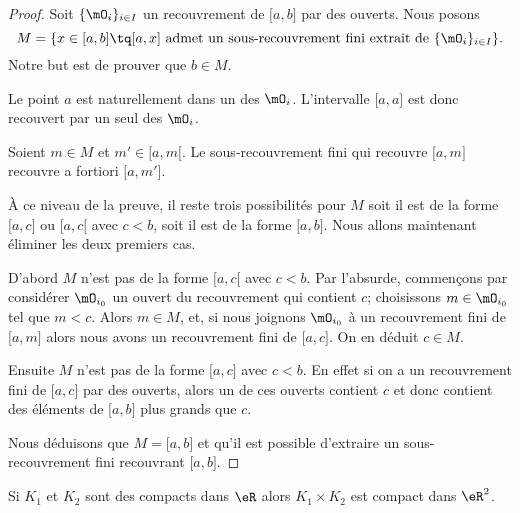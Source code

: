 \begin{proof}
	Soit \( \{ \mO_i \}_{i\in I}\) un recouvrement de \( \mathopen[ a , b \mathclose]\) par des ouverts. Nous posons
	\begin{equation}
		M=\{ x\in\mathopen[ a , b \mathclose]\tq \mathopen[ a , x \mathclose] \text{ admet un sous-recouvrement fini extrait de } \{ \mO_i \}_{i\in I} \}.
	\end{equation}
	Notre but est de prouver que \( b\in M\).
	\begin{subproof}

		Le point \( a\) est naturellement dans un des \( \mO_i\). L'intervalle \( \mathopen[ a , a \mathclose]\) est donc recouvert par un seul des \( \mO_i\).

		Soient \( m\in M\) et \( m'\in\mathopen[ a , m [\). Le sous-recouvrement fini qui recouvre \( \mathopen[ a , m \mathclose]\) recouvre a fortiori \( \mathopen[ a , m' \mathclose]\).

		À ce niveau de la preuve, il reste trois possibilités pour \( M\) soit il est de la forme \( \mathopen[ a , c \mathclose]\) ou \( \mathopen[ a , c [\) avec \( c<b\), soit il est de la forme \( \mathopen[ a , b \mathclose]\). Nous allons maintenant éliminer les deux premiers cas.

		D'abord \( M\) n'est pas de la forme \( \mathopen[ a , c [\) avec \( c<b\). Par l'absurde, commençons par considérer \( \mO_{i_0}\) un ouvert du recouvrement qui contient \( c\); choisissons  \(m \in \mO_{i_0}\) tel que \( m<c\). Alors \( m \in M \), et, si nous joignons \( \mO_{i_0}\) à un recouvrement fini de \( \mathopen[ a , m \mathclose]\) alors nous avons un recouvrement fini de \( \mathopen[ a , c \mathclose]\). On en déduit \( c\in M\).

		Ensuite \( M\) n'est pas de la forme \( \mathopen[ a , c \mathclose]\) avec \( c<b\). En effet si on a un recouvrement fini de \( \mathopen[ a , c \mathclose]\) par des ouverts, alors un de ces ouverts contient \( c\) et donc contient des éléments de \( \mathopen[ a , b \mathclose]\) plus grands que \( c\).
	\end{subproof}
	Nous déduisons que \( M=\mathopen[ a , b \mathclose]\) et qu'il est possible d'extraire un sous-recouvrement fini recouvrant \( \mathopen[ a , b \mathclose]\).
\end{proof}

\begin{lemma}\label{LemCKBooXkwkte}
	Si \( K_1\) et \( K_2\) sont des compacts dans \( \eR\) alors \( K_1\times K_2\) est compact dans \( \eR^2\).
\end{lemma}


